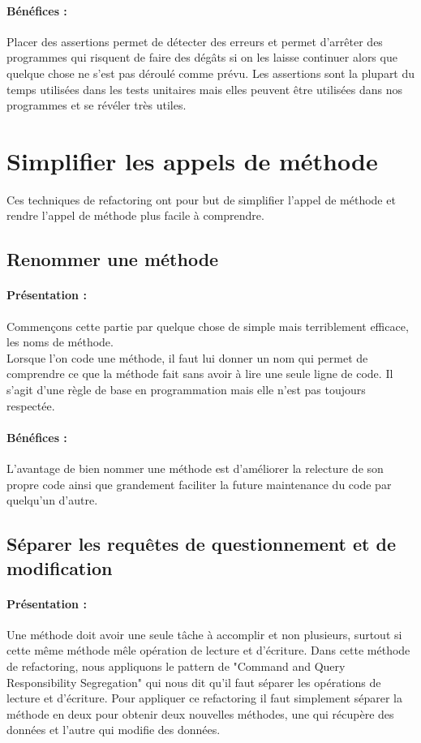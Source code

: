 \documentclass[a4paper,twoside,12pt,openright]{report}
\begin{document}
\paragraph{Bénéfices :}
Placer des assertions permet de détecter des erreurs et permet d'arrêter des programmes qui risquent de faire des dégâts si on les laisse continuer alors que quelque chose ne s'est pas déroulé comme prévu.
Les assertions sont la plupart du temps utilisées dans les tests unitaires mais elles peuvent être utilisées dans nos programmes et se révéler très utiles.\\

\newpage
\section{Simplifier les appels de méthode}
Ces techniques de refactoring ont pour but de simplifier l'appel de méthode et rendre l'appel de méthode plus facile à comprendre.\\



\subsection{Renommer une méthode}
\paragraph{Présentation :}
Commençons cette partie par quelque chose de simple mais terriblement efficace, les noms de méthode.\\
Lorsque l'on code une méthode, il faut lui donner un nom qui permet de comprendre ce que la méthode fait sans avoir à lire une seule ligne de code. Il s'agit d'une règle de base en programmation mais elle n'est pas toujours respectée.

\paragraph{Bénéfices :}
L'avantage de bien nommer une méthode est d'améliorer la relecture de son propre code ainsi que grandement faciliter la future maintenance du code par quelqu'un d'autre.\\

\subsection{Séparer les requêtes de questionnement et de modification}
\paragraph{Présentation :}
Une méthode doit avoir une seule tâche à accomplir et non plusieurs, surtout si cette même méthode mêle opération de lecture et d'écriture.
Dans cette méthode de refactoring, nous appliquons le pattern de "Command and Query Responsibility Segregation" qui nous dit qu'il faut séparer les opérations de lecture et d'écriture.
Pour appliquer ce refactoring il faut simplement séparer la méthode en deux pour obtenir deux nouvelles méthodes, une qui récupère des données et l'autre qui modifie des données.
\end{document}
